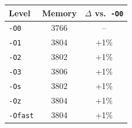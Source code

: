 \begin{tabular*}{\columnwidth}{@{\extracolsep\fill}lcc@{\extracolsep\fill}}
\toprule
\textbf{Level} & \textbf{Memory} & \textbf{$\Delta$ vs.\ \texttt{-O0}} \\
\midrule
\texttt{-O0} & 3766 & -- \\
\texttt{-O1} & 3804 & +1\% \\
\texttt{-O2} & 3802 & +1\% \\
\texttt{-O3} & 3806 & +1\% \\
\texttt{-Os} & 3802 & +1\% \\
\texttt{-Oz} & 3804 & +1\% \\
\texttt{-Ofast} & 3804 & +1\% \\
\bottomrule
\end{tabular*}

